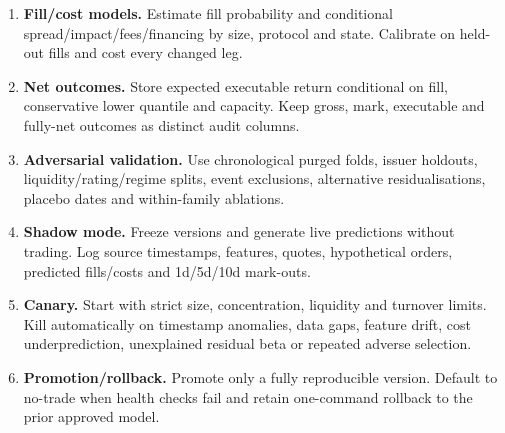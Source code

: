 \documentclass[10pt]{article}
\begin{document}
\begin{enumerate}[leftmargin=2em,label=\textbf{A\arabic*.}]
\item \textbf{Fill/cost models.} Estimate fill probability and conditional spread/impact/fees/financing by size, protocol and state. Calibrate on held-out fills and cost every changed leg.
\item \textbf{Net outcomes.} Store expected executable return conditional on fill, conservative lower quantile and capacity. Keep gross, mark, executable and fully-net outcomes as distinct audit columns.
\item \textbf{Adversarial validation.} Use chronological purged folds, issuer holdouts, liquidity/rating/regime splits, event exclusions, alternative residualisations, placebo dates and within-family ablations.
\item \textbf{Shadow mode.} Freeze versions and generate live predictions without trading. Log source timestamps, features, quotes, hypothetical orders, predicted fills/costs and 1d/5d/10d mark-outs.
\item \textbf{Canary.} Start with strict size, concentration, liquidity and turnover limits. Kill automatically on timestamp anomalies, data gaps, feature drift, cost underprediction, unexplained residual beta or repeated adverse selection.
\item \textbf{Promotion/rollback.} Promote only a fully reproducible version. Default to no-trade when health checks fail and retain one-command rollback to the prior approved model.
\end{enumerate}
\end{document}
